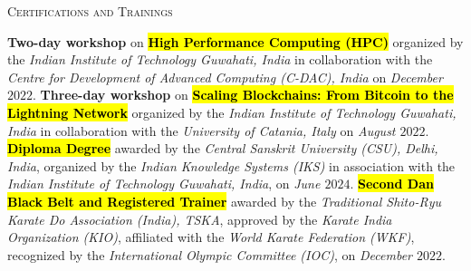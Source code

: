 \begin{rubric}{\textsc{Certifications and Trainings}}

%
 \textbf{Two-day workshop} on \hl{\textbf{High Performance Computing (HPC)}} organized by the \emph{Indian Institute of Technology Guwahati, India} in collaboration with the \emph{Centre for Development of Advanced Computing (C-DAC), India} on \emph{December $2022$}.
%
 \textbf{Three-day workshop} on \hl{\textbf{Scaling Blockchains: From Bitcoin to the Lightning Network}} organized by the \emph{Indian Institute of Technology Guwahati, India} in collaboration with the \emph{University of Catania, Italy} on \emph{August $2022$}.
%
 \hl{\textbf{Diploma Degree}} awarded by the \emph{Central Sanskrit University (CSU), Delhi, India}, organized by the \emph{Indian Knowledge Systems (IKS)} in association with the \emph{Indian Institute of Technology Guwahati, India}, on \emph{June $2024$}.
%
 \hl{\textbf{Second Dan Black Belt and Registered Trainer}} awarded by the \emph{Traditional Shito-Ryu Karate Do Association (India), TSKA}, approved by the \emph{Karate India Organization (KIO)}, affiliated with the \emph{World Karate Federation (WKF)}, recognized by the \emph{International Olympic Committee (IOC)}, on \emph{December $2022$}.
%
\end{rubric}